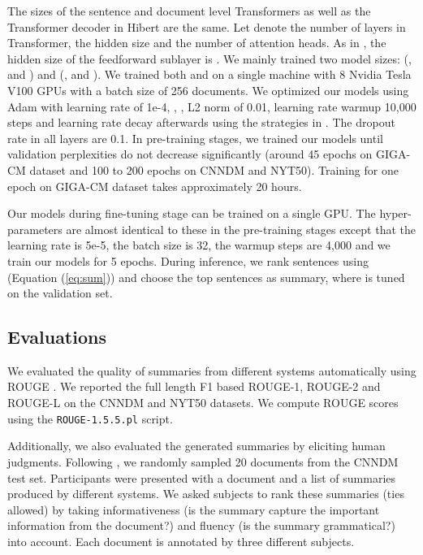 \documentclass[11pt,a4paper]{article}
\begin{document}
The sizes of the sentence and document level Transformers as well as the Transformer decoder in {\sc Hibert} are the same. Let  denote the number of layers in Transformer,  the hidden size and  the number of attention heads. As in \cite{vaswani:2017:nips,devlin:2018:arxiv}, the hidden size of the feedforward sublayer is . We mainly trained two model sizes:  (,  and ) and  (,  and ). We trained both  and  on a single machine with 8 Nvidia Tesla V100 GPUs with a batch size of 256 documents. We optimized our models using Adam with learning rate of 1e-4, , , L2 norm of 0.01, learning rate warmup 10,000 steps and learning rate decay afterwards using the strategies in . The dropout rate in all layers are 0.1. In pre-training stages, we trained our models until validation perplexities do not decrease significantly (around 45 epochs on GIGA-CM dataset and 100 to 200 epochs on CNNDM and NYT50). Training  for one epoch on GIGA-CM dataset takes approximately 20 hours. 

Our models during fine-tuning stage can be trained on a single GPU. The hyper-parameters are almost identical to these in the pre-training stages except that the learning rate is 5e-5, the batch size is 32, the warmup steps are 4,000 and we train our models for 5 epochs. During inference, we rank sentences using 
 (Equation (\ref{eq:sum})) and choose the top  sentences as summary, where  is tuned on the validation set.

\subsection{Evaluations}
We evaluated the quality of summaries from different systems automatically using ROUGE \cite{lin:2004:acl:w}. We reported the full length F1 based ROUGE-1, ROUGE-2 and ROUGE-L on the \mbox{CNNDM} and NYT50 datasets. 
We compute ROUGE scores using the {\tt ROUGE-1.5.5.pl} script.

Additionally, we also evaluated the generated summaries by eliciting human judgments. Following \cite{cheng:2016:acl,Narayan:ea:2018}, we randomly sampled 20 documents from the CNNDM test set. Participants were presented with a document and a list of summaries produced by different systems. We asked subjects to rank these summaries (ties allowed) by taking {informativeness} (is the summary capture the important information from the document?) and \mbox{fluency} (is the summary grammatical?) into account. Each document is annotated by three different subjects. 
\end{document}
